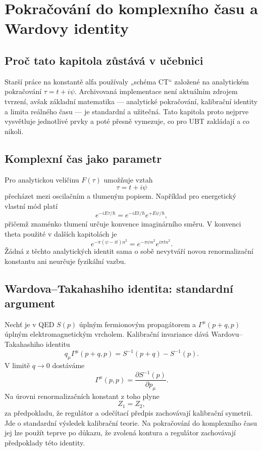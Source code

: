 
\chapter{Pokračování do komplexního času a Wardovy identity}
\label{ch:ct-scheme}

\section{Proč tato kapitola zůstává v učebnici}
Starší práce na konstantě alfa používaly „schéma CT“ založené na analytickém
pokračování \(\tau=t+i\psi\). Archivovaná implementace není aktuálním zdrojem
tvrzení, avšak základní matematika --- analytické pokračování, kalibrační
identity a limita reálného času --- je standardní a užitečná. Tato kapitola
proto nejprve vysvětluje jednotlivé prvky a poté přesně vymezuje, co pro UBT
zakládají a co nikoli.

\section{Komplexní čas jako parametr}
Pro analytickou veličinu $F(\tau)$ umožňuje vztah
\[
 \tau=t+i\psi
\]
přecházet mezi oscilačním a tlumeným popisem. Například pro energetický vlastní
mód platí
\[
 e^{-iE\tau/\hbar}=e^{-iEt/\hbar}e^{+E\psi/\hbar},
\]
přičemž znaménko tlumení určuje konvence imaginárního směru. V konvenci theta
použité v dalších kapitolách je
\[
 e^{-\pi(\psi-it)n^2}
 =e^{-\pi\psi n^2}e^{i\pi t n^2}.
\]
Žádná z těchto analytických identit sama o sobě nevytváří novou renormalizační
konstantu ani neurčuje fyzikální vazbu.

\section{Wardova--Takahashiho identita: standardní argument}
Nechť je v QED $S(p)$ úplným fermionovým propagátorem a
$\Gamma^\mu(p+q,p)$ úplným elektromagnetickým vrcholem. Kalibrační invariance
dává Wardovu--Takahashiho identitu
\[
 q_\mu\Gamma^\mu(p+q,p)
 =S^{-1}(p+q)-S^{-1}(p).
\]
V limitě $q\to0$ dostáváme
\[
 \Gamma^\mu(p,p)=\frac{\partial S^{-1}(p)}{\partial p_\mu}.
\]
Na úrovni renormalizačních konstant z toho plyne
\[
 \boxed{Z_1=Z_2,}
\]
za předpokladu, že regulátor a odečítací předpis zachovávají kalibrační
symetrii. Jde o standardní výsledek kalibrační teorie. Na pokračování do
komplexního času jej lze použít teprve po důkazu, že zvolená kontura a regulátor
zachovávají předpoklady této identity.

